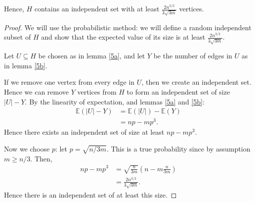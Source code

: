 \documentclass{unswmaths}
\begin{document}
\begin{corollary}[Part (c)]
    Hence, $H$ contains an independent set with at least $\frac{2n^{3/2}}{3\sqrt{3m}}$
    vertices.
\end{corollary}
\begin{proof}
    We will use the probabilistic method: we will define
    a random independent subset of $H$ and show that the
    expected value of its size is at least $\frac{2n^{3/2}}{3\sqrt{3m}}$.
    
    Let $U \subseteq H$ be chosen as in lemma \ref{5a}, and let
    $Y$ be the number of edges in $U$ as in lemma \ref{5b}. 
    
    If we remove one vertex from every edge in $U$, then we create an independent
    set. Hence we can remove $Y$ vertices from $H$ to form an independent set
    of size $|U|-Y$.
    By the linearity of expectation, and lemmas \ref{5a} and \ref{5b}:
    \begin{align*}
        \mathbb{E}(|U|-Y) &= \mathbb{E}(|U|)-\mathbb{E}(Y)\\
                          &= np - mp^3.
    \end{align*}
    Hence there exists an independent set of size at least $np-mp^3$. 
    
    Now we choose $p$: let $p = \sqrt{n/3m}$. This is a true probability
    since by assumption $m \geq n/3$. Then,
    \begin{align*}
        np - mp^3 &= \sqrt{\frac{n}{3m}}(n-m\frac{n}{3m})\\
                  &= \frac{2n^{3/2}}{3\sqrt{3m}}.
    \end{align*}
    Hence there is an independent set of at least this size.
\end{proof}
\end{document}
